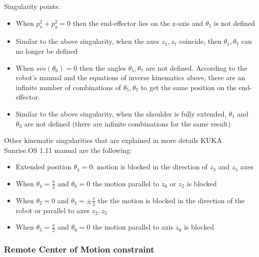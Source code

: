 Singularity points:
\begin{itemize}
	\item When $p_x^2 + p_y^2 = 0$ then the end-effector lies on the z-axis and $θ_1$ is not defined
	\item Similar to the above singularity, when the axes $z_1,z_7$ coincide, then $θ_1,θ_7$ can no longer be defined
	\item When $sin\left( θ_6 \right) = 0$ then the angles $θ_5, θ_7$ are not defined. According to the robot's manual and the equations of inverse kinematics above, there are an infinite number of combinations of
	$θ_5, θ_7$ to get the same position on the end-effector.
	\item Similar to the above singularity, when the shoulder is fully extended, $θ_1$ and $θ_3$ are not defined (there are infinite combinations for the same result)
\end{itemize}
Other kinematic singularities that are explained in more details KUKA Sunrise.OS 1.11 manual are the following:
\begin{itemize}
	\item Extended position $θ_4 = 0$: motion is blocked in the direction of $z_3$ and $z_5$ axes
	\item When $θ_4 = \frac{π}{2}$ and $θ_6 = 0$ the motion parallel to $z_6$ or $z_2$ is blocked
	\item When $θ_2 = 0$ and $θ_3 = \pm \frac{π}{2}$ the the motion is blocked in the direction of the robot or parallel to axes $z_2,z_5$
	\item When $θ_5 = \frac{π}{2}$ and $θ_6 = 0$ the motion parallel to axis $z_6$ is blocked
\end{itemize}

\subsubsection{Remote Center of Motion constraint}
\label{rcm-subsubsection}

